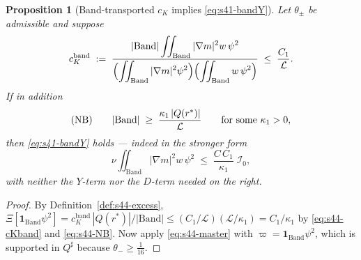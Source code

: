 \documentclass[11pt]{article}
\newtheorem{proposition}[theorem]{Proposition}
\theoremstyle{definition}
\theoremstyle{remark}
\begin{document}
\begin{proposition}[Band-transported $c_K$ implies \eqref{eq:s41-bandY}]
  \label{prop:s44-transport}
  Let $\theta_\pm$ be admissible and suppose
  \begin{equation}\label{eq:s44-cKband}
    c_K^{\mathrm{band}}
    \;:=\;
    \frac{|\mathrm{Band}|\displaystyle\iint_{\mathrm{Band}}
        |\nabla m|^2w\,\psi^2}
         {\Bigl(\displaystyle\iint_{\mathrm{Band}}|\nabla m|^2\psi^2\Bigr)
          \Bigl(\displaystyle\iint_{\mathrm{Band}}w\,\psi^2\Bigr)}
    \;\leq\;\frac{C_1}{\mathcal{L}} .
  \end{equation}
  If in addition
  \begin{equation}\label{eq:s44-NB}
    \textup{(NB)}\qquad
    |\mathrm{Band}| \;\geq\;\frac{\kappa_1\,|Q(r^*)|}{\mathcal{L}}
    \qquad\text{for some }\kappa_1>0 ,
  \end{equation}
  then \eqref{eq:s41-bandY} holds --- indeed in the stronger form
  \[
    \nu\iint_{\mathrm{Band}}|\nabla m|^2w\,\psi^2
    \;\leq\;\frac{C\,C_1}{\kappa_1}\;\mathcal{I}_0 ,
  \]
  with neither the $Y$-term nor the $D$-term needed on the right.
\end{proposition}
\begin{proof}
  By Definition~\ref{def:s44-excess},
  $\Xi[\mathbf{1}_{\mathrm{Band}}\psi^2]
  = c_K^{\mathrm{band}}\,|Q(r^*)|/|\mathrm{Band}|
  \leq (C_1/\mathcal{L})(\mathcal{L}/\kappa_1)=C_1/\kappa_1$ by
  \eqref{eq:s44-cKband} and \eqref{eq:s44-NB}. Now apply
  \eqref{eq:s44-master} with $\varpi=\mathbf{1}_{\mathrm{Band}}\psi^2$, which
  is supported in $Q^\sharp$ because $\theta_-\geq\tfrac1{16}$.
\end{proof}
\end{document}
